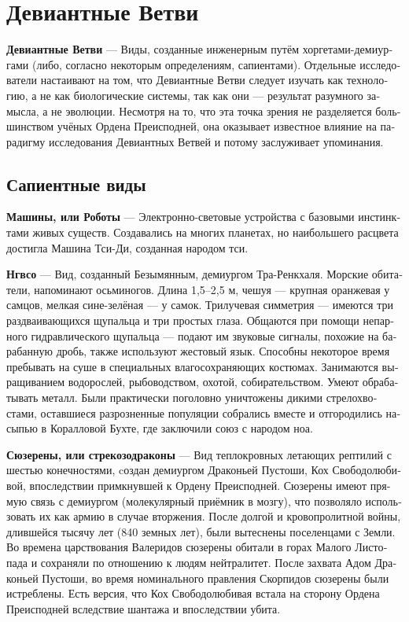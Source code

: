 \documentclass[a4paper,12pt,fleqn]{book}\usepackage{cooltooltips}\usepackage{polyglossia}\setdefaultlanguage[babelshorthands=true]{russian}\setotherlanguage{english}\defaultfontfeatures{Ligatures=TeX,Mapping=tex-text} \usepackage{xcolor}\definecolor{lightgray}{HTML}{bbbbbb}\color{lightgray}\newcommand{\ml}[3]{\textenglish{\textcolor{black}{#3}}}
\newcommand{\theterm}[3]{\textbf{\hypertarget{#1}{#2}} --- #3}
\begin{document}
\section{Девиантные Ветви}

\theterm{deviant-forks}
{Девиантные Ветви}
{Виды, созданные инженерным путём хоргетами-демиургами (либо, согласно некоторым определениям, сапиентами).
Отдельные исследователи настаивают на том, что Девиантные Ветви следует изучать как технологию, а не как биологические системы, так как они --- результат разумного замысла, а не эволюции.
Несмотря на то, что эта точка зрения не разделяется большинством учёных Ордена Преисподней, она оказывает известное влияние на парадигму исследования Девиантных Ветвей и потому заслуживает упоминания.}

\subsection{Сапиентные виды}

\theterm{machinae}
{Машины, или Роботы}
{Электронно-световые устройства с базовыми инстинктами живых существ.
Создавались на многих планетах, но наибольшего расцвета достигла Машина Тси-Ди, созданная народом тси.}

\theterm{ngvso}
{Нгвсо}
{Вид, созданный Безымянным, демиургом Тра-Ренкхаля.
Морские обитатели, напоминают осьминогов.
Длина 1,5--2,5 м, чешуя --- крупная оранжевая у самцов, мелкая сине-зелёная --- у самок.
Трилучевая симметрия --- имеются три раздваивающихся щупальца и три простых глаза.
Общаются при помощи непарного гидравлического щупальца --- подают им звуковые сигналы, похожие на барабанную дробь, также используют жестовый язык.
Способны некоторое время пребывать на суше в специальных влагосохраняющих костюмах.
Занимаются выращиванием водорослей, рыбоводством, охотой, собирательством.
Умеют обрабатывать металл.
Были практически поголовно уничтожены дикими стрелохвостами, оставшиеся разрозненные популяции собрались вместе и отгородились насыпью в Коралловой Бухте, где заключили союз с народом ноа.}

\theterm{souzerena}
{Сюзерены, или стрекозодраконы}
{Вид теплокровных летающих рептилий с шестью конечностями, cоздан демиургом Драконьей Пустоши, Кох Свободолюбивой, впоследствии примкнувшей к Ордену Преисподней.
Сюзерены имеют прямую связь с демиургом (молекулярный приёмник в мозгу), что позволяло использовать их как армию в случае вторжения.
После долгой и кровопролитной войны, длившейся тысячу лет (840 земных лет), были вытеснены поселенцами с Земли.
Во времена царствования Валеридов сюзерены обитали в горах Малого Листопада и сохраняли по отношению к людям нейтралитет.
После захвата Адом Драконьей Пустоши, во время номинального правления Скорпидов сюзерены были истреблены.
Есть версия, что Кох Свободолюбивая встала на сторону Ордена Преисподней вследствие шантажа и впоследствии убита.}
\end{document}
